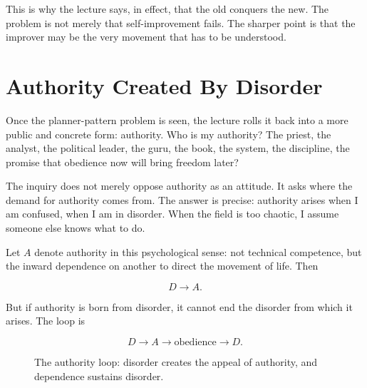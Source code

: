 This is why the lecture says, in effect, that the old conquers the new. The problem is not merely that self-improvement fails. The sharper point is that the improver may be the very movement that has to be understood.

\section{Authority Created By Disorder}

Once the planner-pattern problem is seen, the lecture rolls it back into a more public and concrete form: authority. Who is my authority? The priest, the analyst, the political leader, the guru, the book, the system, the discipline, the promise that obedience now will bring freedom later?

The inquiry does not merely oppose authority as an attitude. It asks where the demand for authority comes from. The answer is precise: authority arises when I am confused, when I am in disorder. When the field is too chaotic, I assume someone else knows what to do.

Let \(A\) denote authority in this psychological sense: not technical competence, but the inward dependence on another to direct the movement of life. Then

\begin{equation}
D \longrightarrow A.
\end{equation}

But if authority is born from disorder, it cannot end the disorder from which it arises. The loop is

\begin{equation}
D \longrightarrow A \longrightarrow \mathrm{obedience}
\longrightarrow D.
\end{equation}

\begin{figure}
\centering
{}
\caption{The authority loop: disorder creates the appeal of authority, and dependence sustains disorder.}
\end{figure}

